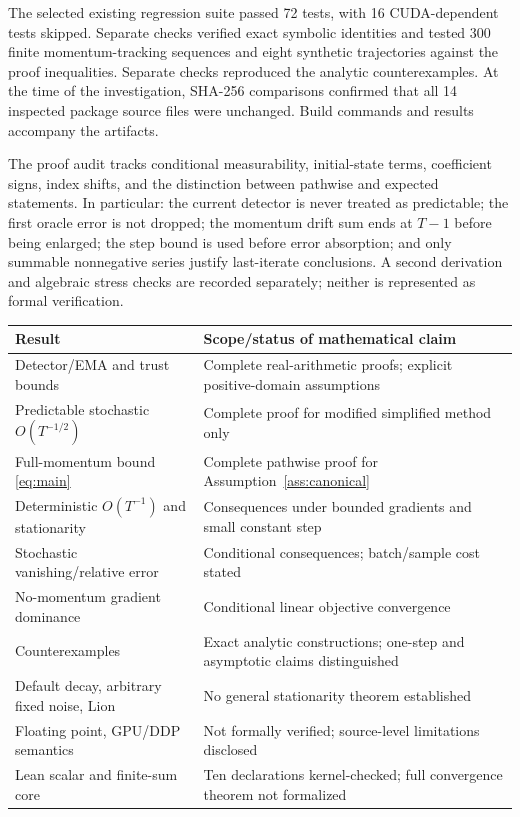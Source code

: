 \documentclass[11pt]{article}
\theoremstyle{definition}
\theoremstyle{remark}
\begin{document}
The selected existing regression suite passed 72 tests, with 16 CUDA-dependent
tests skipped. Separate checks verified exact symbolic identities and tested
300 finite momentum-tracking sequences and eight synthetic trajectories against
the proof inequalities. Separate checks reproduced the analytic counterexamples.
At the time of the investigation, SHA-256 comparisons confirmed that all 14
inspected package source files were unchanged. Build commands and results
accompany the artifacts.

The proof audit tracks conditional measurability, initial-state terms,
coefficient signs, index shifts, and the distinction between pathwise and
expected statements. In particular: the current detector is never treated as
predictable; the first oracle error is not dropped; the momentum drift sum
ends at $T-1$ before being enlarged; the step bound is used before error
absorption; and only summable nonnegative series justify last-iterate
conclusions. A second derivation and algebraic stress checks are recorded
separately; neither is represented as formal verification.

\begin{center}\small
\begin{tabular}{p{.43\linewidth}p{.48\linewidth}}
\toprule
Result & Scope/status of mathematical claim\\
\midrule
Detector/EMA and trust bounds & Complete real-arithmetic proofs; explicit positive-domain assumptions\\
Predictable stochastic $O(T^{-1/2})$ & Complete proof for modified simplified method only\\
Full-momentum bound \eqref{eq:main} & Complete pathwise proof for Assumption~\ref{ass:canonical}\\
Deterministic $O(T^{-1})$ and stationarity & Consequences under bounded gradients and small constant step\\
Stochastic vanishing/relative error & Conditional consequences; batch/sample cost stated\\
No-momentum gradient dominance & Conditional linear objective convergence\\
Counterexamples & Exact analytic constructions; one-step and asymptotic claims distinguished\\
Default decay, arbitrary fixed noise, Lion & No general stationarity theorem established\\
Floating point, GPU/DDP semantics & Not formally verified; source-level limitations disclosed\\
Lean scalar and finite-sum core & Ten declarations kernel-checked; full convergence theorem not formalized\\
\bottomrule
\end{tabular}
\end{center}
\end{document}
